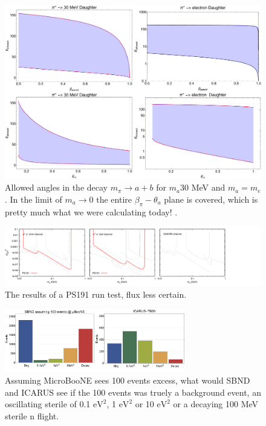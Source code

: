 \documentclass[11pt, a4paper]{article}
\begin{document}
\begin{figure}[t]
\center
\includegraphics[width=1.0\textwidth]{figures/angles_boost.pdf}
\caption{\label{fig:boost} Allowed angles in the decay $m_\pi \rightarrow a+b$ for $m_a 30$ MeV and $m_a=m_e$. In the limit of $m_a \rightarrow 0$ the entire $\beta_\pi - \theta_a$ plane is covered, which is pretty much what we were calculating today!   .}
\end{figure}


\begin{figure}[t]
\center
\includegraphics[width=1.0\textwidth]{figures/zerobg_um4_ps191_test.pdf}
\caption{The results of a PS191 run test, flux less certain.}
\end{figure}

	
\begin{figure}[t]
\center
\includegraphics[width=0.7\textwidth]{figures/baseline_comp.pdf}
\caption{\label{fig:baseline_comp} Assuming MicroBooNE sees 100 events excess, what would SBND and ICARUS see if the 100 events was truely a background event, an oscillating sterile of 0.1 $\text{eV}^2$, 1  $\text{eV}^2$ or 10 $\text{eV}^2$ or a decaying 100 MeV sterile n flight. }
\end{figure}




{}
\end{document}
